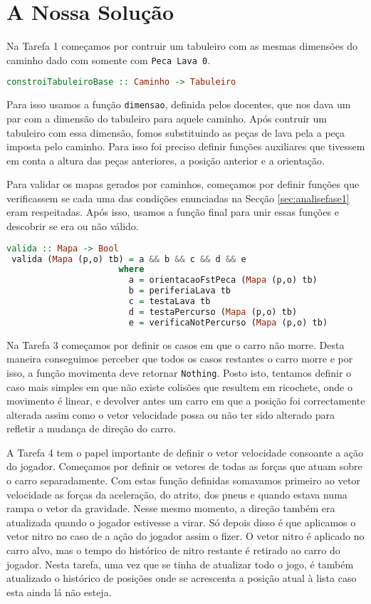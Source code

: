 \chapter{A Nossa Solução}
\label{sec:solucao}

Na Tarefa 1 começamos por contruir um tabuleiro com as mesmas dimensões do
caminho dado com somente com \texttt{Peca Lava 0}.

\begin{lstlisting}[language=Haskell]
 constroiTabuleiroBase :: Caminho -> Tabuleiro
\end{lstlisting}

Para isso usamos a função \texttt{dimensao}, definida pelos docentes, que nos dava
um par com a dimensão do tabuleiro para aquele caminho. Após contruir um
tabuleiro com essa dimensão, fomos substituindo as peças de lava pela a peça
imposta pelo caminho. Para isso foi preciso definir funções auxiliares que
tivessem em conta a altura das peças anteriores, a posição anterior e a
orientação.

Para validar os mapas gerados por caminhos, começamos por definir funções que
verificassem se cada uma das condições enunciadas na Secção
\ref{sec:analisefase1} eram respeitadas. Após isso, usamos a função final para
unir essas funções e descobrir se era ou não válido.

\begin{lstlisting}[language=Haskell]
 valida :: Mapa -> Bool
 valida (Mapa (p,o) tb) = a && b && c && d && e
                      where
                        a = orientacaoFstPeca (Mapa (p,o) tb)
                        b = periferiaLava tb
                        c = testaLava tb
                        d = testaPercurso (Mapa (p,o) tb)
                        e = verificaNotPercurso (Mapa (p,o) tb)
\end{lstlisting}

Na Tarefa 3 começamos por definir os casos em que o carro não morre. Desta
maneira conseguimos perceber que todos os casos restantes o carro morre e por
isso, a função movimenta deve retornar \texttt{Nothing}. Posto isto, tentamos
definir o caso mais simples em que não existe colisões que resultem em
ricochete, onde o movimento é linear, e devolver antes um carro em que a posição
foi correctamente alterada assim como o vetor velocidade possa ou não ter sido
alterado para refletir a mudança de direção do carro.

A Tarefa 4 tem o papel importante de definir o vetor velocidade consoante a ação
do jogador. Começamos por definir os vetores de todas as forças que atuam sobre
o carro separadamente. Com estas função definidas somavamos primeiro ao vetor
velocidade as forças da aceleração, do atrito, dos pneus e quando estava numa
rampa o vetor da gravidade. Nesse mesmo momento, a direção também era atualizada
quando o jogador estivesse a virar. Só depois disso é que aplicamos o vetor
nitro no caso de a ação do jogador assim o fizer. O vetor nitro é aplicado no
carro alvo, mas o tempo do histórico de nitro restante é retirado ao carro do
jogador. Nesta tarefa, uma vez que se tinha de atualizar todo o jogo, é também
atualizado o histórico de posições onde se acrescenta a posição atual à lista
caso esta ainda lá não esteja.

